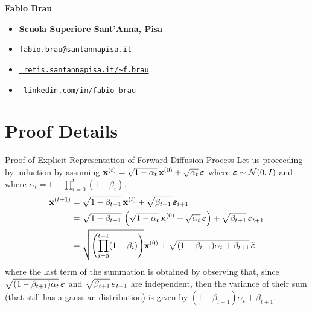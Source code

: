 \documentclass[aspectratio=169, 9pt]{beamer}
\theoremstyle{definition}
\begin{document}
{\begin{frame}{}
  \begin{minipage}[h]{0.6\textwidth}
  {\large\bf Fabio Brau}
  \vspace{5pt}
  \begin{itemize}
    \item[\faUniversity] {\bf Scuola Superiore Sant'Anna, Pisa}
    \item[\Letter] \texttt{fabio.brau@santannapisa.it}
    \item[\faGlobe] \href{http://retis.santannapisa.it/~f.brau/}{\tt %
                    retis.santannapisa.it/\textasciitilde f.brau}
    \item[\faLinkedin]
      \href{https://www.linkedin.com/in/fabio-brau}{\tt%
        linkedin.com/in/fabio-brau}
  \end{itemize}
  \end{minipage}
\end{frame}
}

\appendix
\section{Proof Details}
\begin{frame}{Proof of Explicit Representation of Forward Diffusion Process}
  Let us proceeding by induction by assuming 
  $\mathbf{x}^{(t)} = \sqrt{1-\alpha_t}\, \mathbf{x}^{(0)} + \sqrt{\alpha_t}\,{\boldsymbol{\varepsilon}}$
  where ${\boldsymbol{\varepsilon}}\sim\mathcal{N}(0,I)$ and where $\alpha_t =
  1-\prod_{i=0}^t(1-\beta_i)$. 
  \begin{equation}
    \begin{aligned}
      \mathbf{x}^{(t+1)} &=  \sqrt{1-\beta_{t+1}}\, \mathbf{x}^{(t)} +
      \sqrt{\beta_{t+1}}\,{\boldsymbol{\varepsilon}}_{t+1}\\
      &=\sqrt{1-\beta_{t+1}}\, \left(
      \sqrt{1-\alpha_t}\, \mathbf{x}^{(0)} + \sqrt{\alpha_t}\,{\boldsymbol{\varepsilon}}\right) +
      \sqrt{\beta_{t+1}}\,{\boldsymbol{\varepsilon}}_{t+1}\\
      &= \sqrt{\left( \prod_{i=0}^{t+1}(1-\beta_i) \right)}\mathbf{x}^{(0)} +
      \sqrt{(1-\beta_{t+1})\alpha_t+\beta_{t+1}}\,\tilde{{\boldsymbol{\varepsilon}}}
    \end{aligned}
  \end{equation}
    where the last term of the summation is obtained by observing that, since
    $\sqrt{(1-\beta_{t+1})\alpha_t}\,{\boldsymbol{\varepsilon}}$ and $\sqrt{\beta_{t+1}}\,{\boldsymbol{\varepsilon}}_{t+1}$ 
      are independent, then the variance of their sum (that still has a
      gaussian distribution) is given by
      $(1-\beta_{t+1})\alpha_t+ \beta_{t+1}$.
\end{frame}
\end{document}
